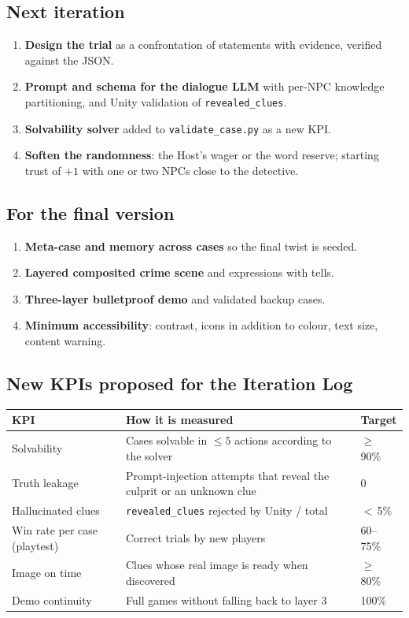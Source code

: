 \documentclass[11pt,a4paper]{article}
\newcommand{\file}[1]{\texttt{\small #1}}
\begin{document}
\subsection*{Next iteration}
\begin{enumerate}[resume]
\item \textbf{Design the trial} as a confrontation of statements with evidence, verified against the
JSON.
\item \textbf{Prompt and schema for the dialogue LLM} with per-NPC knowledge partitioning, and Unity
validation of \texttt{revealed\_clues}.
\item \textbf{Solvability solver} added to \file{validate\_case.py} as a new KPI.
\item \textbf{Soften the randomness}: the Host's wager or the word reserve; starting trust of $+1$
with one or two NPCs close to the detective.
\end{enumerate}

\subsection*{For the final version}
\begin{enumerate}[resume]
\item \textbf{Meta-case and memory across cases} so the final twist is seeded.
\item \textbf{Layered composited crime scene} and expressions with tells.
\item \textbf{Three-layer bulletproof demo} and validated backup cases.
\item \textbf{Minimum accessibility}: contrast, icons in addition to colour, text size, content
warning.
\end{enumerate}

\subsection*{New KPIs proposed for the Iteration Log}
\begin{center}
\renewcommand{\arraystretch}{1.2}
\begin{tabularx}{\linewidth}{l X l}
\toprule
\textbf{KPI} & \textbf{How it is measured} & \textbf{Target} \\
\midrule
Solvability & Cases solvable in $\leq 5$ actions according to the solver & $\geq$\,90\% \\
Truth leakage & Prompt-injection attempts that reveal the culprit or an unknown clue & 0 \\
Hallucinated clues & \texttt{revealed\_clues} rejected by Unity / total & $<$\,5\% \\
Win rate per case (playtest) & Correct trials by new players & 60--75\% \\
Image on time & Clues whose real image is ready when discovered & $\geq$\,80\% \\
Demo continuity & Full games without falling back to layer 3 & 100\% \\
\bottomrule
\end{tabularx}
\end{center}
\end{document}
